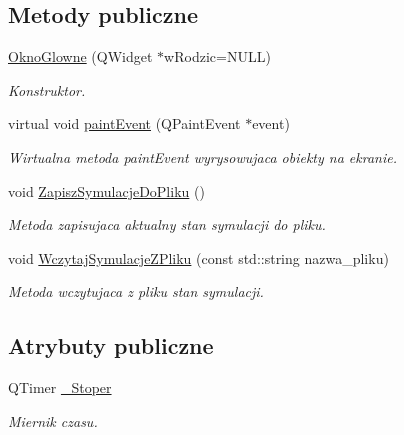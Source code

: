 \subsection*{Metody publiczne}
\begin{DoxyCompactItemize}
\item 
\hyperlink{class_okno_glowne_a8dcfe4e0f18dfaf0c535c4549991b550}{Okno\-Glowne} (Q\-Widget $\ast$w\-Rodzic=N\-U\-L\-L)
\begin{DoxyCompactList}\small\item\em Konstruktor. \end{DoxyCompactList}\item 
virtual void \hyperlink{class_okno_glowne_a570c795e3829c3bd7896551c0624abe2}{paint\-Event} (Q\-Paint\-Event $\ast$event)
\begin{DoxyCompactList}\small\item\em Wirtualna metoda paint\-Event wyrysowujaca obiekty na ekranie. \end{DoxyCompactList}\item 
void \hyperlink{class_okno_glowne_a6062f76fdf15ad8bc0543cfd2a2fe150}{Zapisz\-Symulacje\-Do\-Pliku} ()
\begin{DoxyCompactList}\small\item\em Metoda zapisujaca aktualny stan symulacji do pliku. \end{DoxyCompactList}\item 
void \hyperlink{class_okno_glowne_a1b8098c27e9656235bb056aeb79a8ece}{Wczytaj\-Symulacje\-Z\-Pliku} (const std\-::string nazwa\-\_\-pliku)
\begin{DoxyCompactList}\small\item\em Metoda wczytujaca z pliku stan symulacji. \end{DoxyCompactList}\end{DoxyCompactItemize}
\subsection*{Atrybuty publiczne}
\begin{DoxyCompactItemize}
\item 
Q\-Timer \hyperlink{class_okno_glowne_a5d047f90666212f58e69d11af3285d9b}{\-\_\-\-Stoper}
\begin{DoxyCompactList}\small\item\em Miernik czasu. \end{DoxyCompactList}\end{DoxyCompactItemize}

